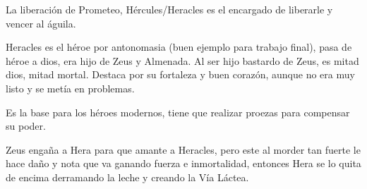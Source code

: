 La liberación de Prometeo, Hércules/Heracles es el encargado de liberarle y vencer al águila.

Heracles es el héroe por antonomasia (buen ejemplo para trabajo final), pasa de héroe a dios, era hijo de Zeus y Almenada. Al ser hijo bastardo de Zeus, es mitad dios, mitad mortal. Destaca por su fortaleza y buen corazón, aunque no era muy listo y se metía en problemas.

Es la base para los héroes modernos, tiene que realizar proezas para compensar su poder.

Zeus engaña a Hera para que amante a Heracles, pero este al morder tan fuerte le hace daño y nota que va ganando fuerza e inmortalidad, entonces Hera se lo quita de encima derramando la leche y creando la Vía Láctea.
